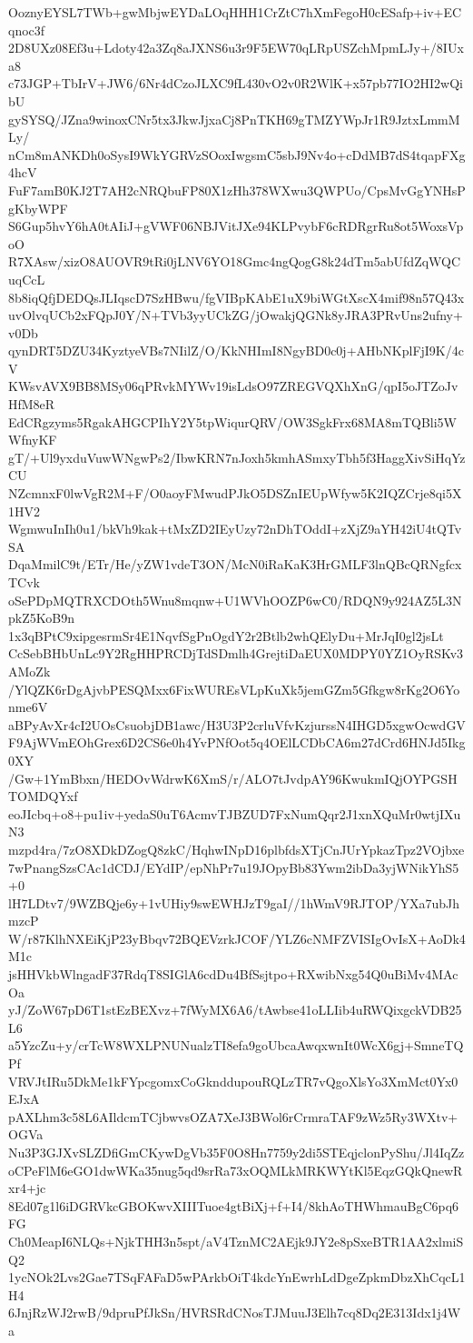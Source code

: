 OoznyEYSL7TWb+gwMbjwEYDaLOqHHH1CrZtC7hXmFegoH0cESafp+iv+ECqnoc3f
2D8UXz08Ef3u+Ldoty42a3Zq8aJXNS6u3r9F5EW70qLRpUSZchMpmLJy+/8IUxa8
c73JGP+TbIrV+JW6/6Nr4dCzoJLXC9fL430vO2v0R2WlK+x57pb77IO2HI2wQibU
gySYSQ/JZna9winoxCNr5tx3JkwJjxaCj8PnTKH69gTMZYWpJr1R9JztxLmmMLy/
nCm8mANKDh0oSysI9WkYGRVzSOoxIwgsmC5sbJ9Nv4o+cDdMB7dS4tqapFXg4hcV
FuF7amB0KJ2T7AH2cNRQbuFP80X1zHh378WXwu3QWPUo/CpsMvGgYNHsPgKbyWPF
S6Gup5hvY6hA0tAIiJ+gVWF06NBJVitJXe94KLPvybF6cRDRgrRu8ot5WoxsVpoO
R7XAsw/xizO8AUOVR9tRi0jLNV6YO18Gmc4ngQogG8k24dTm5abUfdZqWQCuqCcL
8b8iqQfjDEDQsJLIqscD7SzHBwu/fgVIBpKAbE1uX9biWGtXscX4mif98n57Q43x
uvOlvqUCb2xFQpJ0Y/N+TVb3yyUCkZG/jOwakjQGNk8yJRA3PRvUns2ufny+v0Db
qynDRT5DZU34KyztyeVBs7NIilZ/O/KkNHImI8NgyBD0c0j+AHbNKplFjI9K/4cV
KWsvAVX9BB8MSy06qPRvkMYWv19isLdsO97ZREGVQXhXnG/qpI5oJTZoJvHfM8eR
EdCRgzyms5RgakAHGCPIhY2Y5tpWiqurQRV/OW3SgkFrx68MA8mTQBli5WWfnyKF
gT/+Ul9yxduVuwWNgwPs2/IbwKRN7nJoxh5kmhASmxyTbh5f3HaggXivSiHqYzCU
NZcmnxF0lwVgR2M+F/O0aoyFMwudPJkO5DSZnIEUpWfyw5K2IQZCrje8qi5X1HV2
WgmwuInIh0u1/bkVh9kak+tMxZD2IEyUzy72nDhTOddI+zXjZ9aYH42iU4tQTvSA
DqaMmilC9t/ETr/He/yZW1vdeT3ON/McN0iRaKaK3HrGMLF3lnQBcQRNgfcxTCvk
oSePDpMQTRXCDOth5Wnu8mqnw+U1WVhOOZP6wC0/RDQN9y924AZ5L3NpkZ5KoB9n
1x3qBPtC9xipgesrmSr4E1NqvfSgPnOgdY2r2Btlb2whQElyDu+MrJqI0gl2jsLt
CcSebBHbUnLc9Y2RgHHPRCDjTdSDmlh4GrejtiDaEUX0MDPY0YZ1OyRSKv3AMoZk
/YlQZK6rDgAjvbPESQMxx6FixWUREsVLpKuXk5jemGZm5Gfkgw8rKg2O6Yonme6V
aBPyAvXr4cI2UOsCsuobjDB1awc/H3U3P2crluVfvKzjurssN4IHGD5xgwOcwdGV
F9AjWVmEOhGrex6D2CS6e0h4YvPNfOot5q4OElLCDbCA6m27dCrd6HNJd5Ikg0XY
/Gw+1YmBbxn/HEDOvWdrwK6XmS/r/ALO7tJvdpAY96KwukmIQjOYPGSHTOMDQYxf
eoJIcbq+o8+pu1iv+yedaS0uT6AcmvTJBZUD7FxNumQqr2J1xnXQuMr0wtjIXuN3
mzpd4ra/7zO8XDkDZogQ8zkC/HqhwINpD16plbfdsXTjCnJUrYpkazTpz2VOjbxe
7wPnangSzsCAc1dCDJ/EYdIP/epNhPr7u19JOpyBb83Ywm2ibDa3yjWNikYhS5+0
lH7LDtv7/9WZBQje6y+1vUHiy9swEWHJzT9gaI//1hWmV9RJTOP/YXa7ubJhmzcP
W/r87KlhNXEiKjP23yBbqv72BQEVzrkJCOF/YLZ6cNMFZVISIgOvIsX+AoDk4M1c
jsHHVkbWlngadF37RdqT8SIGlA6cdDu4BfSsjtpo+RXwibNxg54Q0uBiMv4MAcOa
yJ/ZoW67pD6T1stEzBEXvz+7fWyMX6A6/tAwbse41oLLIib4uRWQixgckVDB25L6
a5YzcZu+y/crTcW8WXLPNUNualzTI8efa9goUbcaAwqxwnIt0WcX6gj+SmneTQPf
VRVJtIRu5DkMe1kFYpcgomxCoGknddupouRQLzTR7vQgoXlsYo3XmMct0Yx0EJxA
pAXLhm3c58L6AIldcmTCjbwvsOZA7XeJ3BWol6rCrmraTAF9zWz5Ry3WXtv+OGVa
Nu3P3GJXvSLZDfiGmCKywDgVb35F0O8Hn7759y2di5STEqjclonPyShu/Jl4IqZz
oCPeFlM6eGO1dwWKa35nug5qd9srRa73xOQMLkMRKWYtKl5EqzGQkQnewRxr4+jc
8Ed07g1l6iDGRVkcGBOKwvXIIITuoe4gtBiXj+f+I4/8khAoTHWhmauBgC6pq6FG
Ch0MeapI6NLQs+NjkTHH3n5spt/aV4TznMC2AEjk9JY2e8pSxeBTR1AA2xlmiSQ2
1ycNOk2Lvs2Gae7TSqFAFaD5wPArkbOiT4kdcYnEwrhLdDgeZpkmDbzXhCqcL1H4
6JnjRzWJ2rwB/9dpruPfJkSn/HVRSRdCNosTJMuuJ3Elh7cq8Dq2E313Idx1j4Wa
